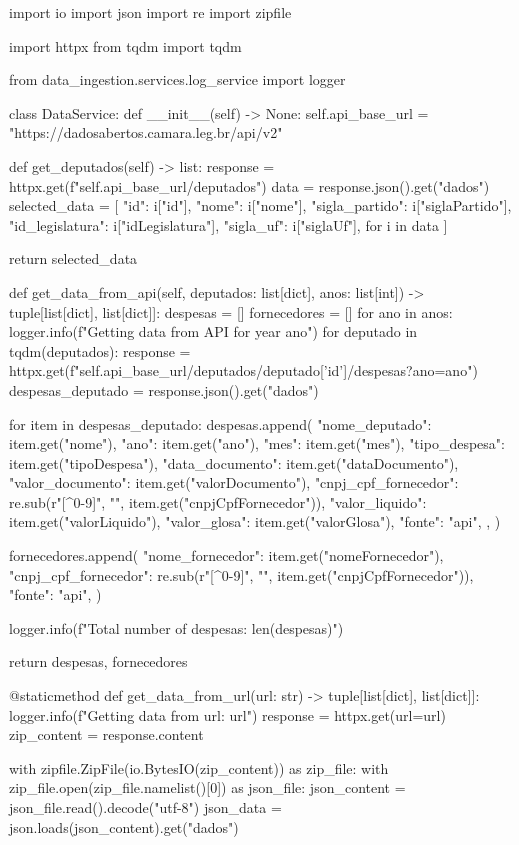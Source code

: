 \documentclass[12pt, a4paper]{article}
\begin{document}
\begin{python}
import io
import json
import re
import zipfile

import httpx
from tqdm import tqdm

from data_ingestion.services.log_service import logger


class DataService:
	def __init__(self) -> None:
		self.api_base_url = "https://dadosabertos.camara.leg.br/api/v2"
	
	def get_deputados(self) -> list:
		response = httpx.get(f"{self.api_base_url}/deputados")
		data = response.json().get("dados")
		selected_data = [
			{
				"id": i["id"],
				"nome": i["nome"],
				"sigla_partido": i["siglaPartido"],
				"id_legislatura": i["idLegislatura"],
				"sigla_uf": i["siglaUf"],
			}
			for i in data
		]
		
		return selected_data
	
	def get_data_from_api(self, deputados: list[dict], anos: list[int]) -> tuple[list[dict], list[dict]]:
		despesas = []
		fornecedores = []
		for ano in anos:
		logger.info(f"Getting data from API for year {ano}")
		for deputado in tqdm(deputados):
		response = httpx.get(f"{self.api_base_url}/deputados/{deputado['id']}/despesas?ano={ano}")
		despesas_deputado = response.json().get("dados")
		
		for item in despesas_deputado:
		despesas.append(
		{
			"nome_deputado": item.get("nome"),
			"ano": item.get("ano"),
			"mes": item.get("mes"),
			"tipo_despesa": item.get("tipoDespesa"),
			"data_documento": item.get("dataDocumento"),
			"valor_documento": item.get("valorDocumento"),
			"cnpj_cpf_fornecedor": re.sub(r"[^0-9]", "", item.get("cnpjCpfFornecedor")),
			"valor_liquido": item.get("valorLiquido"),
			"valor_glosa": item.get("valorGlosa"),
			"fonte": "api",
		},
		)
		
		fornecedores.append({
			"nome_fornecedor": item.get("nomeFornecedor"),
			"cnpj_cpf_fornecedor": re.sub(r"[^0-9]", "", item.get("cnpjCpfFornecedor")),
			"fonte": "api",
		})
		
		logger.info(f"Total number of despesas: {len(despesas)}")
		
		return despesas, fornecedores
	
	@staticmethod
	def get_data_from_url(url: str) -> tuple[list[dict], list[dict]]:
		logger.info(f"Getting data from url: {url}")
		response = httpx.get(url=url)
		zip_content = response.content
		
		with zipfile.ZipFile(io.BytesIO(zip_content)) as zip_file:
		with zip_file.open(zip_file.namelist()[0]) as json_file:
		json_content = json_file.read().decode("utf-8")
		json_data = json.loads(json_content).get("dados")
		

\end{python}
\end{document}
